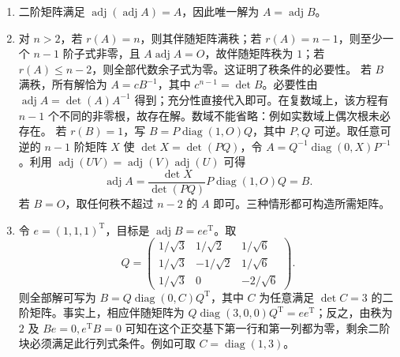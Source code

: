 \documentclass[UTF8,12pt,a4paper,fontset=fandol]{ctexart}
\begin{document}
\begin{solve}
\begin{enumerate}
\item 二阶矩阵满足 $\operatorname{adj}(\operatorname{adj}A)=A$，因此唯一解为 $A=\operatorname{adj}B$。
\item 对 $n>2$，若 $r(A)=n$，则其伴随矩阵满秩；若 $r(A)=n-1$，则至少一个 $n-1$ 阶子式非零，且 $A\operatorname{adj}A=O$，故伴随矩阵秩为 $1$；若 $r(A)\le n-2$，则全部代数余子式为零。这证明了秩条件的必要性。
若 $B$ 满秩，所有解恰为 $A=cB^{-1}$，其中 $c^{n-1}=\det B$。必要性由 $\operatorname{adj}A=\det(A)A^{-1}$ 得到；充分性直接代入即可。在复数域上，该方程有 $n-1$ 个不同的非零根，故存在解。数域不能省略：例如实数域上偶次根未必存在。
若 $r(B)=1$，写 $B=P\operatorname{diag}(1,O)Q$，其中 $P,Q$ 可逆。取任意可逆的 $n-1$ 阶矩阵 $X$ 使 $\det X=\det(PQ)$，令 $A=Q^{-1}\operatorname{diag}(0,X)P^{-1}$。利用 $\operatorname{adj}(UV)=\operatorname{adj}(V)\operatorname{adj}(U)$ 可得
\[\operatorname{adj}A=\frac{\det X}{\det(PQ)}P\operatorname{diag}(1,O)Q=B.\]
若 $B=O$，取任何秩不超过 $n-2$ 的 $A$ 即可。三种情形都可构造所需矩阵。
\item 令 $e=(1,1,1)^{\mathrm T}$，目标是 $\operatorname{adj}B=ee^{\mathrm T}$。取
\[Q=\begin{pmatrix}1/\sqrt3&1/\sqrt2&1/\sqrt6\\1/\sqrt3&-1/\sqrt2&1/\sqrt6\\1/\sqrt3&0&-2/\sqrt6\end{pmatrix}.\]
则全部解可写为 $B=Q\operatorname{diag}(0,C)Q^{\mathrm T}$，其中 $C$ 为任意满足 $\det C=3$ 的二阶矩阵。事实上，相应伴随矩阵为 $Q\operatorname{diag}(3,0,0)Q^{\mathrm T}=ee^{\mathrm T}$；反之，由秩为 $2$ 及 $Be=0,e^{\mathrm T}B=0$ 可知在这个正交基下第一行和第一列都为零，剩余二阶块必须满足此行列式条件。例如可取 $C=\operatorname{diag}(1,3)$。\end{enumerate}
\end{solve}
\end{document}
